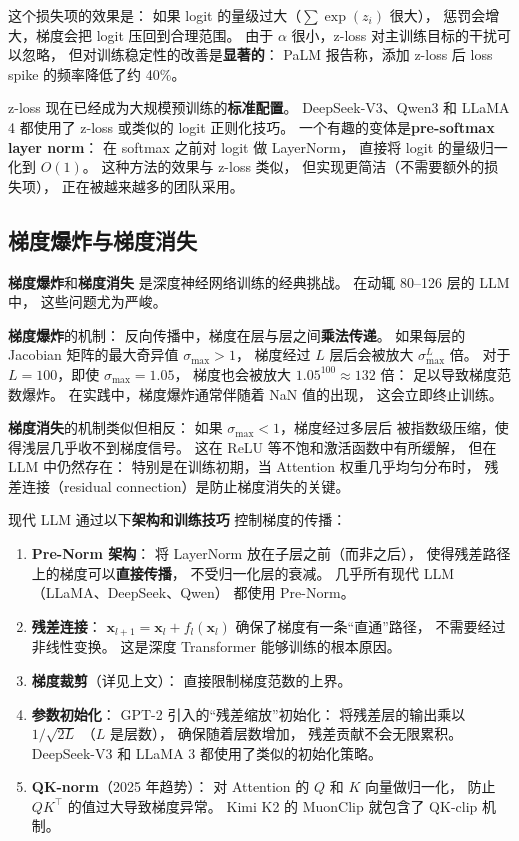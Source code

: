 这个损失项的效果是：
如果 logit 的量级过大（$\sum \exp(z_i)$ 很大），
惩罚会增大，梯度会把 logit 压回到合理范围。
由于 $\alpha$ 很小，z-loss 对主训练目标的干扰可以忽略，
但对训练稳定性的改善是\textbf{显著的}：
PaLM 报告称，添加 z-loss 后
loss spike 的频率降低了约 40\%。

z-loss 现在已经成为大规模预训练的\textbf{标准配置}。
DeepSeek-V3、Qwen3 和 LLaMA 4 都使用了 z-loss
或类似的 logit 正则化技巧。
一个有趣的变体是\textbf{pre-softmax layer norm}：
在 softmax 之前对 logit 做 LayerNorm，
直接将 logit 的量级归一化到 $O(1)$。
这种方法的效果与 z-loss 类似，
但实现更简洁（不需要额外的损失项），
正在被越来越多的团队采用。

\subsection{梯度爆炸与梯度消失}

\textbf{梯度爆炸}和\textbf{梯度消失}
是深度神经网络训练的经典挑战。
在动辄 80--126 层的 LLM 中，
这些问题尤为严峻。

\textbf{梯度爆炸}的机制：
反向传播中，梯度在层与层之间\textbf{乘法传递}。
如果每层的 Jacobian 矩阵的最大奇异值 $\sigma_{\max} > 1$，
梯度经过 $L$ 层后会被放大 $\sigma_{\max}^L$ 倍。
对于 $L = 100$，即使 $\sigma_{\max} = 1.05$，
梯度也会被放大 $1.05^{100} \approx 132$ 倍：
足以导致梯度范数爆炸。
在实践中，梯度爆炸通常伴随着 NaN 值的出现，
这会立即终止训练。

\textbf{梯度消失}的机制类似但相反：
如果 $\sigma_{\max} < 1$，梯度经过多层后
被指数级压缩，使得浅层几乎收不到梯度信号。
这在 ReLU 等不饱和激活函数中有所缓解，
但在 LLM 中仍然存在：
特别是在训练初期，当 Attention 权重几乎均匀分布时，
残差连接（residual connection）是防止梯度消失的关键。

现代 LLM 通过以下\textbf{架构和训练技巧}
控制梯度的传播：

\begin{enumerate}[noitemsep]
  \item \textbf{Pre-Norm 架构}：
        将 LayerNorm 放在子层之前（而非之后），
        使得残差路径上的梯度可以\textbf{直接传播}，
        不受归一化层的衰减。
        几乎所有现代 LLM（LLaMA、DeepSeek、Qwen）
        都使用 Pre-Norm。
  \item \textbf{残差连接}：
        $\mathbf{x}_{l+1} = \mathbf{x}_l + f_l(\mathbf{x}_l)$
        确保了梯度有一条“直通”路径，
        不需要经过非线性变换。
        这是深度 Transformer 能够训练的根本原因。
  \item \textbf{梯度裁剪}（详见上文）：
        直接限制梯度范数的上界。
  \item \textbf{参数初始化}：
        GPT-2 引入的“残差缩放”初始化：
        将残差层的输出乘以 $1/\sqrt{2L}$
        （$L$ 是层数），
        确保随着层数增加，
        残差贡献不会无限累积。
        DeepSeek-V3 和 LLaMA 3 都使用了类似的初始化策略。
  \item \textbf{QK-norm}（2025 年趋势）：
        对 Attention 的 $Q$ 和 $K$ 向量做归一化，
        防止 $QK^\top$ 的值过大导致梯度异常。
        Kimi K2 的 MuonClip 就包含了 QK-clip 机制。
\end{enumerate}

